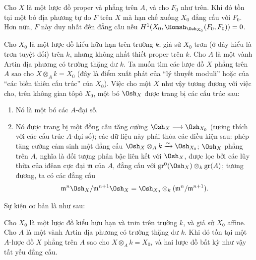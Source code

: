  Cho $X$ là một lược đồ proper và phẳng trên $A$, và cho
$F_0$ như trên. Khi đó tồn tại một bó địa phương tự do $F$ trên $X$ mà hạn chế
xuống $X_0$ đẳng cấu với $F_0$. Hơn nữa, $F$ này duy nhất đến đẳng cấu nếu
$H^1(X_0,\Homsh_{\Osh_{X_0}}(F_0,F_0))=0$.

Cho $X_0$ là một lược đồ kiểu hữu hạn trên trường $k$; giả sử $X_0$ trơn (ở
đây hiểu là trơn tuyệt đối) trên $k$, nhưng không nhất thiết proper trên $k$.
Cho $A$ là một vành Artin địa phương có trường thặng dư $k$. Ta muốn tìm các
lược đồ $X$ phẳng trên $A$ sao cho $X\otimes_A k=X_0$ (đây là điểm xuất phát
của “lý thuyết moduli” hoặc của “các biến thiên cấu trúc” của $X_0$). Việc cho
một $X$ như vậy tương đương với việc cho, trên không gian tôpô $X_0$, một bó
$\Osh_X$ được trang bị các cấu trúc sau:
\begin{enumerate}
  \item[\textit{i.}] Nó là một bó các $A$-đại số.
  \item[\textit{ii.}] Nó được trang bị một đồng cấu tăng cường
    $\Osh_X\longrightarrow\Osh_{X_0}$ (tương thích với các cấu trúc
    $A$-đại số); các dữ liệu này phải thỏa các điều kiện sau: phép tăng cường
    cảm sinh một đẳng cấu
    $\Osh_X\otimes_A k\xrightarrow{\sim}\Osh_{X_0}$; $\Osh_X$ phẳng trên
    $A$, nghĩa là đối tượng phân bậc liên kết với $\Osh_X$, được lọc bởi các
    lũy thừa của iđêan cực đại $\mathfrak m$ của $A$, đẳng cấu với
    $\operatorname{gr}^0(\Osh_X)\otimes_k\operatorname{gr}(A)$; tương đương,
    ta có các đẳng cấu
    \[
      \mathfrak m^n\Osh_X/\mathfrak m^{n+1}\Osh_X
      =\Osh_{X_0}\otimes_k(\mathfrak m^n/\mathfrak m^{n+1}).
    \]
\end{enumerate}
Sự kiện cơ bản là như sau:

 Cho $X_0$ là một lược đồ kiểu hữu hạn và trơn trên trường
$k$, và giả sử $X_0$ affine. Cho $A$ là một vành Artin địa phương có trường
thặng dư $k$. Khi đó tồn tại một $A$-lược đồ $X$ phẳng trên $A$ sao cho
$X\otimes_A k=X_0$, và hai lược đồ bất kỳ như vậy tất yếu đẳng cấu.

